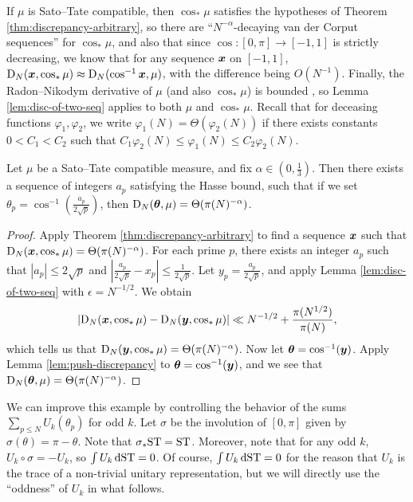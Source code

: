 If $\mu$ is Sato--Tate compatible, then $\cos_\ast\mu$ 
satisfies the hypotheses of Theorem \ref{thm:discrepancy-arbitrary}, so 
there are ``$N^{-\alpha}$-decaying van der Corput sequences'' for 
$\cos_\ast\mu$, and also that since $\cos\colon [0,\pi] \to [-1,1]$ is 
strictly decreasing, we know that for any sequence ${\boldsymbol x}$ on $[-1,1]$, 
$\operatorname{D}_N({\boldsymbol x},\cos_\ast\mu) \approx \operatorname{D}_N(\cos^{-1}{\boldsymbol x},\mu)$, with the 
difference being $O(N^{-1})$.  Finally, the 
Radon--Nikodym derivative of $\mu$ (and also $\cos_\ast\mu$) is bounded , so 
Lemma \ref{lem:disc-of-two-seq} applies to both $\mu$ and $\cos_\ast\mu$. 
Recall that for deceasing functions 
$\varphi_1,\varphi_2$, we write $\varphi_1(N) = \Theta(\varphi_2(N))$ if 
there exists constants $0 < C_1 < C_2$ such that 
$C_1 \varphi_2(N) \leqslant \varphi_1(N) \leqslant C_2 \varphi_2(N)$. 


\begin{theorem}\label{thm:integral-a_p-alpha}
Let $\mu$ be a Sato--Tate compatible measure, and fix 
$\alpha\in \left(0,\frac 1 3\right)$. 
Then there exists a sequence of integers $a_p$ satisfying the Hasse bound, 
such that if we set $\theta_p = \cos^{-1}\left(\frac{a_p}{2\sqrt p}\right)$, 
then $\operatorname{D}_N({\boldsymbol\theta},\mu) = \Theta(\pi(N)^{-\alpha})$. 
\end{theorem}
\begin{proof}
Apply Theorem \ref{thm:discrepancy-arbitrary} to find a sequence ${\boldsymbol x}$ such 
that $\operatorname{D}_N({\boldsymbol x},\cos_\ast \mu) = \Theta(\pi(N)^{-\alpha})$. For each prime 
$p$, there exists an integer $a_p$ such that $|a_p|\leqslant 2\sqrt p$ and 
$\left| \frac{a_p}{2\sqrt p} - x_p\right| \leqslant \frac{1}{2\sqrt p}$. Let 
$y_p = \frac{a_p}{2\sqrt p}$, and apply Lemma \ref{lem:disc-of-two-seq} with 
$\epsilon = N^{-1/2}$. We obtain 
\[
	\left| \operatorname{D}_N({\boldsymbol x},\cos_\ast \mu) - \operatorname{D}_N({\boldsymbol y}, \cos_\ast \mu)\right| \ll  N^{-1/2} + \frac{\pi(N^{1/2})}{\pi(N)} ,
\]
which tells us that $\operatorname{D}_N({\boldsymbol y},\cos_\ast\mu) = \Theta(\pi(N)^{-\alpha})$. 
Now let ${\boldsymbol\theta} = \cos^{-1}({\boldsymbol y})$. Apply Lemma \ref{lem:push-discrepancy} to 
${\boldsymbol\theta} = \cos^{-1}({\boldsymbol y})$, and we see that 
$\operatorname{D}_N({\boldsymbol\theta},\mu) = \Theta(\pi(N)^{-\alpha})$. 
\end{proof}

We can improve this example by controlling the behavior of the sums 
$\sum_{p\leqslant N} U_k(\theta_p)$ for odd $k$. Let $\sigma$ be 
the involution of $[0,\pi]$ given by $\sigma(\theta) = \pi-\theta$. Note that 
$\sigma_\ast \mathrm{ST} = \mathrm{ST}$. Moreover, note that for any odd $k$, 
$U_k\circ\sigma = - U_k$, so $\int U_k\, \mathrm{d}\mathrm{ST} = 0$. Of course, 
$\int U_k \,\mathrm{d}\mathrm{ST} = 0$ for the reason that $U_k$ is the trace of a 
non-trivial unitary representation, but we will directly use the ``oddness'' 
of $U_k$ in what follows.

